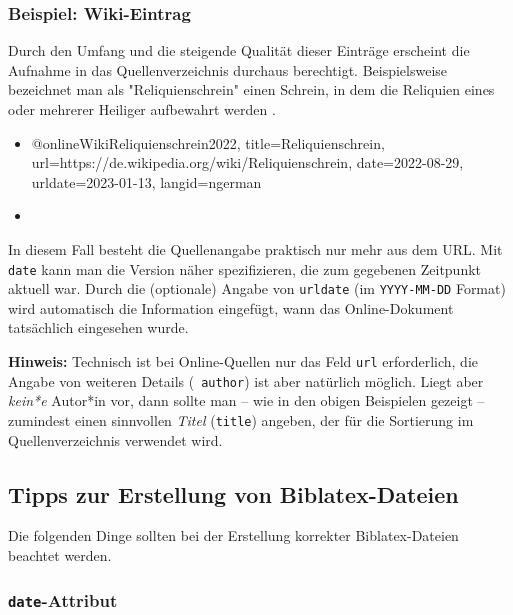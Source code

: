 \subsubsection{Beispiel: Wiki-Eintrag}
\label{sec:@online-www}

Durch den Umfang und die steigende Qualität dieser Einträge erscheint die
Aufnahme in das Quellenverzeichnis durchaus berechtigt. Beispielsweise
bezeichnet man als "Reliquienschrein" einen Schrein, in dem die Reliquien
eines oder mehrerer Heiliger aufbewahrt werden \cite{WikiReliquienschrein2022}.
%
\begin{itemize}
\item[]
\begin{GenericCode}[numbers=none]
@online{WikiReliquienschrein2022,
  title={Reliquienschrein},
  url={https://de.wikipedia.org/wiki/Reliquienschrein},
  date={2022-08-29},
  urldate={2023-01-13},
  langid={ngerman}
}
\end{GenericCode}
\item[\cite{WikiReliquienschrein2022}] 
\end{itemize}
%
In diesem Fall besteht die Quellenangabe praktisch nur mehr aus dem URL. Mit
\texttt{date} kann man die Version näher spezifizieren, die zum gegebenen
Zeitpunkt aktuell war. Durch die (optionale) Angabe von \texttt{urldate} (im
\texttt{YYYY-MM-DD} Format) wird automatisch die Information eingefügt, wann
das Online-Dokument tatsächlich eingesehen wurde.

\noindent%
\textbf{Hinweis:} Technisch ist bei Online-Quellen nur das Feld \texttt{url}
erforderlich, die Angabe von weiteren Details (\zB\ \texttt{author}) ist aber
natürlich möglich. Liegt aber \emph{kein*e} Autor*in vor, dann sollte man --
wie in den obigen Beispielen gezeigt -- zumindest einen sinnvollen
\emph{Titel} (\texttt{title}) angeben, der für die Sortierung im
Quellenverzeichnis verwendet wird.


\subsection{Tipps zur Erstellung von Biblatex-Dateien}
\label{sec:TippsZuBiblatex}

Die folgenden Dinge sollten bei der Erstellung korrekter Biblatex-Dateien
beachtet werden.

\subsubsection{\texttt{date}-Attribut}

